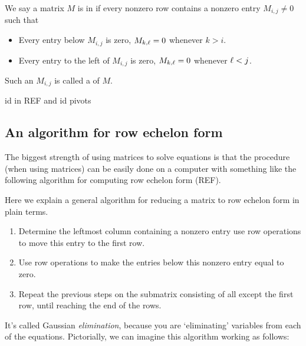 \documentclass{ximera}
\begin{document}
\begin{definition}
We say a matrix $M$ is in  if every nonzero row
contains a nonzero entry $M_{i,j}\ne 0$ such that
\begin{itemize}
\item Every entry below $M_{i,j}$ is zero, $M_{k,\ell}=0$ whenever $k> i$.
\item Every entry to the left of $M_{i,j}$ is zero, $M_{k,\ell}=0$ whenever $\ell < j$.
\end{itemize}
Such an $M_{i,j}$ is called a  of $M$.
\end{definition}

\begin{question}
  id in REF and id pivots
\end{question}



\subsection{An algorithm for row echelon form}

The biggest strength of using matrices to solve equations is that the
procedure (when using matrices) can be easily done on a computer with
something like the following algorithm for computing row echelon form
(REF).

\begin{algorithm}
  Here we explain a general algorithm for reducing a matrix to row
  echelon form in plain terms.
  \begin{enumerate}
  \item Determine the leftmost column containing a nonzero entry use
    row operations to move this entry to the first row.
  \item Use row operations to make the entries below this nonzero entry equal to zero.
  \item Repeat the previous steps on the submatrix consisting of all
    except the first row, until reaching the end of the rows.
  \end{enumerate}
\end{algorithm}

It's called Gaussian \textit{elimination}, because you are
`eliminating' variables from each of the equations.  Pictorially, we
can imagine this algorithm working as follows:
\end{document}
